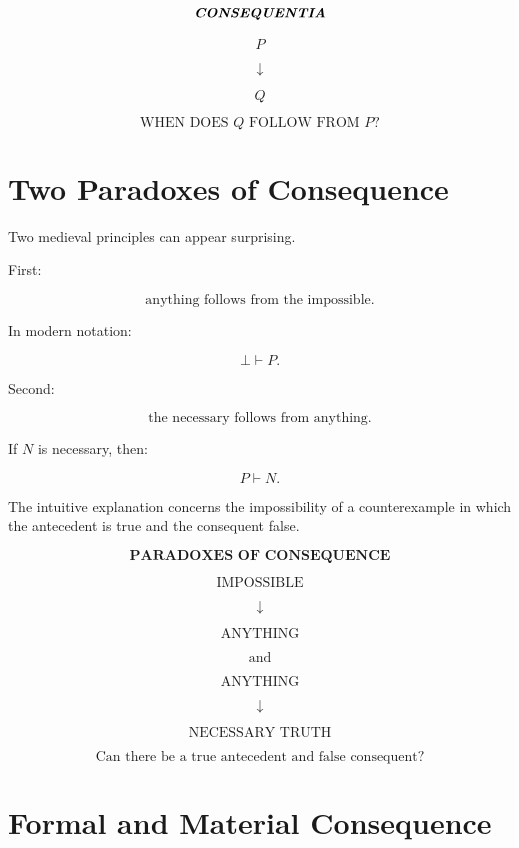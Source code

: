 \documentclass[11pt]{article}
\newcommand{\latin}[1]{\textit{#1}}
\begin{document}
\begin{whiteboard}
\[
\textbf{\latin{CONSEQUENTIA}}
\]

\[
P
\]

\[
\downarrow
\]

\[
Q
\]

\[
\boxed{\text{WHEN DOES }Q\text{ FOLLOW FROM }P\text{?}}
\]
\end{whiteboard}

\section{Two Paradoxes of Consequence}

Two medieval principles can appear surprising.

First:

\[
\text{anything follows from the impossible.}
\]

In modern notation:

\[
\bot \vdash P.
\]

Second:

\[
\text{the necessary follows from anything.}
\]

If \(N\) is necessary, then:

\[
P \vdash N.
\]

The intuitive explanation concerns the impossibility of a
counterexample in which the antecedent is true and the consequent
false.

\begin{whiteboard}
\[
\textbf{PARADOXES OF CONSEQUENCE}
\]

\[
\text{IMPOSSIBLE}
\]

\[
\downarrow
\]

\[
\text{ANYTHING}
\]

\[
\text{and}
\]

\[
\text{ANYTHING}
\]

\[
\downarrow
\]

\[
\text{NECESSARY TRUTH}
\]

\[
\boxed{\text{Can there be a true antecedent and false consequent?}}
\]
\end{whiteboard}

\section{Formal and Material Consequence}
\end{document}
